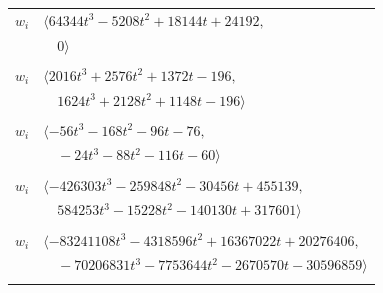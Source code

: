 \documentclass[11pt]{article}
\begin{document}
\begin{longtable}{@{}ll@{}}
$w_i$ & $\langle 64344t^{3}-5208t^{2}+18144t+24192,$\\
 & $\quad 0\rangle$\\
\addlinespace[2pt]
\multicolumn{2}{@{}p{0.97\textwidth}@{}}{$i=33$, $D_i=8$, $\rho_{ij}$: $28{:}2, \allowbreak 30{:}2, \allowbreak 32{:}1, \allowbreak 40{:}1, \allowbreak 45{:}1, \allowbreak 53{:}2, \allowbreak 54{:}2$}\\
$w_i$ & $\langle 2016t^{3}+2576t^{2}+1372t-196,$\\
 & $\quad 1624t^{3}+2128t^{2}+1148t-196\rangle$\\
\addlinespace[2pt]
\multicolumn{2}{@{}p{0.97\textwidth}@{}}{$i=34$, $D_i=8$, $\rho_{ij}$: $0{:}1, \allowbreak 8{:}2, \allowbreak 20{:}2, \allowbreak 24{:}2, \allowbreak 26{:}1, \allowbreak 31{:}1, \allowbreak 51{:}1, \allowbreak 58{:}2$}\\
$w_i$ & $\langle -56t^{3}-168t^{2}-96t-76,$\\
 & $\quad -24t^{3}-88t^{2}-116t-60\rangle$\\
\addlinespace[2pt]
\multicolumn{2}{@{}p{0.97\textwidth}@{}}{$i=35$, $D_i=96$, $e_i=1$, $\rho_{ij}$: $1{:}1, \allowbreak 7{:}2, \allowbreak 11{:}2, \allowbreak 19{:}1, \allowbreak 32{:}2, \allowbreak 38{:}2, \allowbreak 42{:}1, \allowbreak 47{:}2, \allowbreak 50{:}2, \allowbreak 59{:}2, \allowbreak 65{:}1$}\\
$w_i$ & $\langle -426303t^{3}-259848t^{2}-30456t+455139,$\\
 & $\quad 584253t^{3}-15228t^{2}-140130t+317601\rangle$\\
\addlinespace[2pt]
\multicolumn{2}{@{}p{0.97\textwidth}@{}}{$i=36$, $D_i=288$, $e_i=0$, $\rho_{ij}$: $5{:}2, \allowbreak 16{:}1, \allowbreak 20{:}2, \allowbreak 23{:}1, \allowbreak 26{:}1, \allowbreak 29{:}1, \allowbreak 37{:}2, \allowbreak 39{:}1, \allowbreak 40{:}1, \allowbreak 47{:}1, \allowbreak 50{:}2, \allowbreak 51{:}1, \allowbreak 54{:}2, \allowbreak 55{:}2, \allowbreak 62{:}1$}\\
$w_i$ & $\langle -83241108t^{3}-4318596t^{2}+16367022t+20276406,$\\
 & $\quad -70206831t^{3}-7753644t^{2}-2670570t-30596859\rangle$\\
\addlinespace[2pt]
\multicolumn{2}{@{}p{0.97\textwidth}@{}}{$i=37$, $D_i=8$, $\rho_{ij}$: $3{:}2, \allowbreak 6{:}2, \allowbreak 8{:}2, \allowbreak 13{:}1, \allowbreak 17{:}2, \allowbreak 19{:}1, \allowbreak 22{:}2, \allowbreak 24{:}1, \allowbreak 25{:}2, \allowbreak 36{:}1, \allowbreak 41{:}2, \allowbreak 43{:}1, \allowbreak 46{:}1, \allowbreak 52{:}2, \allowbreak 61{:}2, \allowbreak 64{:}2, \allowbreak 65{:}1, \allowbreak 66{:}2$}\\

\end{longtable}
\end{document}
